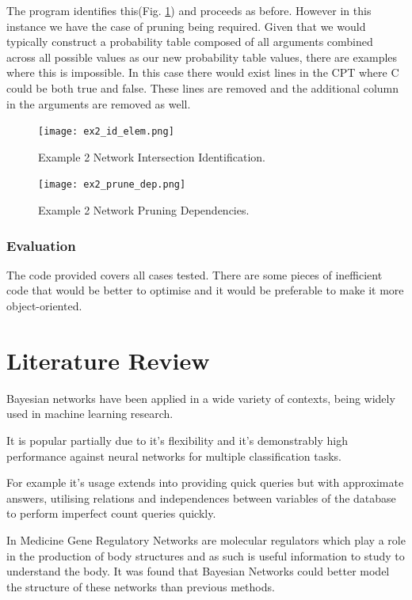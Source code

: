 \documentclass[10pt,a4paper]{article}
\begin{document}
The program identifies this(Fig. \ref{fig:ex2_id_elem}) and proceeds as before. However in this instance we have the case of pruning being required. Given that we would typically construct a probability table composed of all arguments combined across all possible values as our new probability table values, there are examples where this is impossible. In this case there would exist lines in the CPT where C could be both true and false. These lines are removed and the additional column in the arguments are removed as well.

\begin{figure}
\centering
  \texttt{[image: ex2\_id\_elem.png]}
  \caption{Example 2 Network Intersection Identification.}
  \label{fig:ex2_id_elem}
\end{figure}

\begin{figure}
\centering
  \texttt{[image: ex2\_prune\_dep.png]}
  \caption{Example 2 Network Pruning Dependencies.}
  \label{fig:ex2_prune_dep}
\end{figure}

\subsubsection{Evaluation}

The code provided covers all cases tested. There are some pieces of inefficient code that would be better to optimise and  it would be preferable to make it more object-oriented.

\section{Literature Review}

Bayesian networks have been applied in a wide variety of contexts, being widely used in machine learning research.

It is popular partially due to it's flexibility and it's demonstrably high performance against neural networks for multiple classification tasks\cite{book}.

For example it's usage extends into providing quick queries but with approximate answers, utilising relations and independences between variables of the database to perform imperfect count queries quickly\cite{book}.

In Medicine Gene Regulatory Networks are molecular regulators which play a role in the production of body structures and as such is useful information to study to understand the body. It was found that Bayesian Networks could better model the structure of these networks than previous methods\cite{gene}.
\end{document}
